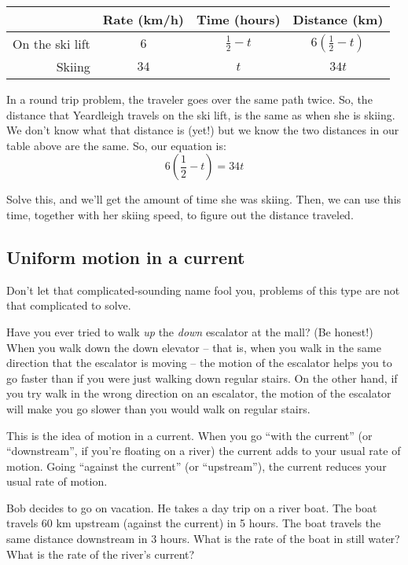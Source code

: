 \begin{center}
\begin{tabular}{r|ccc}
				& Rate (km/h)			& Time (hours)		& Distance (km)\\\hline
On the ski lift	& $6$					& $\frac{1}{2}-t$	& $6\left(\frac{1}{2}-t\right)$\\
Skiing			& $34$					& $t$				& $34t$\\
\end{tabular}
\end{center}

In a round trip problem, the traveler goes over the same path twice. So, the distance that Yeardleigh travels on the ski lift, is the same as when she is skiing. We don't know what that distance is (yet!) but we know the two distances in our table above are the same. So, our equation is:
\[
6\left(\frac{1}{2} - t\right) = 34t
\]

Solve this, and we'll get the amount of time she was skiing. Then, we can use this time, together with her skiing speed, to figure out the distance traveled.

\subsection*{Uniform motion in a current}

Don't let that complicated-sounding name fool you, problems of this type are not that complicated to solve.

Have you ever tried to walk \textit{up} the \textit{down} escalator at the mall? (Be honest!) When you walk down the down elevator -- that is, when you walk in the same direction that the escalator is moving -- the motion of the escalator helps you to go faster than if you were just walking down regular stairs. On the other hand, if you try walk in the wrong direction on an escalator, the motion of the escalator will make you go slower than you would walk on regular stairs.

This is the idea of motion in a current. When you go ``with the current'' (or ``downstream'', if you're floating on a river) the current adds to your usual rate of motion. Going ``against the current'' (or ``upstream''), the current reduces your usual rate of motion.

\begin{boxex}
Bob decides to go on vacation. He takes a day trip on a river boat. The boat travels 60 km upstream (against the current) in 5 hours. The boat travels the same distance downstream in 3 hours. What is the rate of the boat in still water? What is the rate of the river's current?
\end{boxex}

